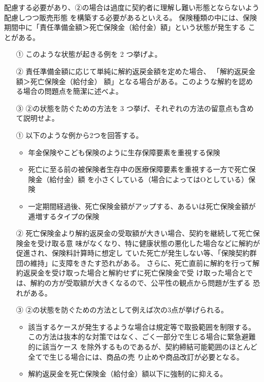 \documentclass[report,gutter=10mm,fore-edge=10mm,uplatex,dvipdfmx]{jlreq}
\begin{document}
配慮する必要があり、②の場合は過度に契約者に理解し難い形態とならないよう配慮しつつ販売形態
を構築する必要があるといえる。
保険種類の中には、保険期間中に「責任準備金額＞死亡保険金（給付金）額」という状態が発生する
ことがある。
\begin{itemize}
 \item [①] このような状態が起きる例を 2 つ挙げよ。
 \item [②] 責任準備金額に応じて単純に解約返戻金額を定めた場合、
「解約返戻金額＞死亡保険金（給付金）
額」となる場合がある。このような解約を認める場合の問題点を簡潔に述べよ。
 \item [③] ②の状態を防ぐための方法を 3 つ挙げ、それぞれの方法の留意点も含めて説明せよ。
\end{itemize}
\begin{itemize}
 \item [①] 以下のような例から2つを回答する。
\begin{itemize}
 \item 年金保険やこども保険のように生存保障要素を重視する保険
 \item 死亡に至る前の被保険者生存中の医療保障要素を重視する一方で死亡保険金（給付金）額
を小さくしている（場合によってはOとしている）保険
 \item 一定期間経過後、死亡保険金額がアップする、あるいは死亡保険金額が逓増するタイプの保険
\end{itemize}
 \item [②]死亡保険金より解約返戻金の受取額が大きい場合、契約を継続して死亡保険金を受け取る意
味がなくなり、特に健康状態の悪化した場合などに解約が促進され、保険料計算時に想定し
ていた死亡が発生しない等、「保険契約群団の維持」に支障をきたす恐れがある。
さらに、死亡直前に解約を行って解約返戻金を受け取った場合と解約せずに死亡保険金で受
け取った場合とでは、解約の方が受取額が大きくなるので、公平性の観点から問題が生ずる
恐れがある。
 \item  [③] ②の状態を防ぐための方法として例えば次の3点が挙げられる。
\begin{itemize}
 \item 該当するケースが発生するような場合は規定等で取扱範囲を制限する。\\
この方法は抜本的な対策ではなく、ごく一部分で生じる場合に緊急避難的に該当ケース
を除外するものであるが、契約締結可能範囲のほとんど全てで生じる場合には、商品の売
り止めや商品改訂が必要となる。
 \item 解約返戻金を死亡保険金（給付金）額以下に強制的に抑える。\\

\end{itemize}
\end{itemize}
\end{document}

